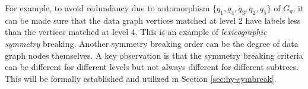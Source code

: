 For example, to avoid redundancy due to automorphism $\{q_1, q_4, q_3, q_2, q_5\}$ of $G_q$, it can be made sure that the data graph vertices matched at level 2 have labels less than the vertices matched at level 4. This is an example of \textit{lexicographic symmetry} breaking.
Another symmetry breaking order can be the degree of data graph nodes themselves.
A key observation is that the symmetry breaking criteria can be different for different levels but not always different for different subtrees.
This will be formally established and utilized in Section \ref{sec:hy-symbreak}.



